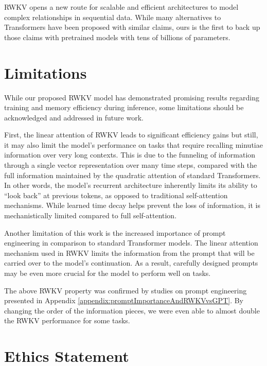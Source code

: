 \documentclass[11pt]{article}
\begin{document}
RWKV opens a new route for scalable and efficient architectures to model complex relationships in sequential data. While many alternatives to Transformers have been proposed with similar claims, ours is the first to back up those claims with pretrained models with tens of billions of parameters.

\section{Limitations}\label{limitations}
While our proposed RWKV model has demonstrated promising results regarding training and memory efficiency during inference, some limitations should be acknowledged and addressed in future work.

First, the linear attention of RWKV leads to significant efficiency gains but still, it may also limit the model's performance on tasks that require recalling minutiae information over very long contexts. This is due to the funneling of information through a single vector representation over many time steps, compared with the full information maintained by the quadratic attention of standard Transformers. In other words, the model's recurrent architecture inherently limits its ability to ``look back'' at previous tokens, as opposed to traditional self-attention mechanisms.
While learned time decay helps prevent the loss of information, it is mechanistically limited compared to full self-attention. 

Another limitation of this work is the increased importance of prompt engineering in comparison to standard Transformer models. The linear attention mechanism used in RWKV limits the information from the prompt that will be carried over to the model's continuation. As a result, carefully designed prompts may be even more crucial for the model to perform well on tasks.

The above RWKV property was confirmed by studies on prompt engineering presented in Appendix \ref{appendix:promptImportanceAndRWKVvsGPT}. By changing the order of the information pieces, we were even able to almost double the RWKV performance for some tasks. 

\section{Ethics Statement}
\end{document}
